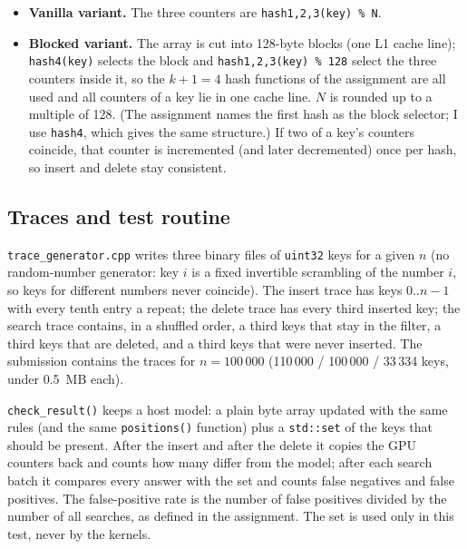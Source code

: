 \documentclass[11pt]{article}
\begin{document}
\begin{itemize}
 seed $s$, where \texttt{scramble} xors the value with two rotations of
 itself (different rotation amounts per hash), multiplies by a second odd
 constant and xors with a right shift by 15. I checked them statistically
 (uniform over 128 and 1024 buckets, about 16 of 32 output bits flip per input
 bit flip, near-independent pairs).
\item \textbf{Vanilla variant.} The three counters are
 \texttt{hash1,2,3(key) \% N}.
\item \textbf{Blocked variant.} The array is cut into 128-byte blocks (one L1
 cache line); \texttt{hash4(key)} selects the block and \texttt{hash1,2,3(key)
 \% 128} select the three counters inside it, so the $k+1=4$ hash functions
 of the assignment are all used and all counters of a key lie in one cache
 line. $N$ is rounded up to a multiple of 128. (The assignment names the first
 hash as the block selector; I use \texttt{hash4}, which gives the same
 structure.) If two of a key's counters coincide, that counter is incremented
 (and later decremented) once per hash, so insert and delete stay consistent.
\end{itemize}

\subsection*{Traces and test routine}
\texttt{trace\_generator.cpp} writes three binary files of \texttt{uint32} keys
for a given $n$ (no random-number generator: key $i$ is a fixed invertible
scrambling of the number $i$, so keys for different numbers never coincide).
The insert trace has keys $0..n-1$ with every tenth entry a repeat; the delete
trace has every third inserted key; the search trace contains, in a shuffled
order, a third keys that stay in the filter, a third keys that are deleted, and
a third keys that were never inserted. The submission contains the traces for
$n=100\,000$ (110\,000 / 100\,000 / 33\,334 keys, under 0.5~MB each).

\texttt{check\_result()} keeps a host model: a plain byte array updated with the
same rules (and the same \texttt{positions()} function) plus a
\texttt{std::set} of the keys that should be present. After the insert and
after the delete it copies the GPU counters back and counts how many differ
from the model; after each search batch it compares every answer with the set
and counts false negatives and false positives. The false-positive rate is the
number of false positives divided by the number of all searches, as defined in
the assignment. The set is used only in this test, never by the kernels.
\end{document}
